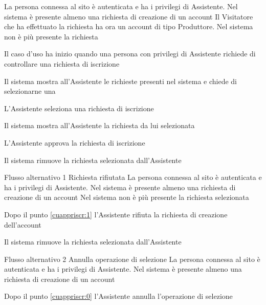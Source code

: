 {}
{La persona connessa al sito è autenticata e ha i privilegi di  Assistente. Nel sistema è presente almeno una richiesta di creazione di un account}
{Il Visitatore che ha effettuato la richiesta ha ora un account di tipo Produttore. Nel sistema non è più presente la richiesta}
{\begin{enumCU}
	\item Il caso d'uso ha inizio quando una persona con privilegi di Assistente richiede di controllare una richiesta di iscrizione
	\item Il sistema mostra all'Assistente le richieste presenti nel sistema e chiede di selezionarne una\label{cuappriscr:0}
	\item L'Assistente seleziona una richiesta di iscrizione
	\item Il sistema mostra all'Assistente la richiesta da lui selezionata\label{cuappriscr:1}
	\item L'Assistente approva la richiesta di iscrizione
	\item Il sistema rimuove la richiesta selezionata dall'Assistente
\end{enumCU}}
%
{Flusso alternativo 1}%
{Richiesta rifiutata}%
{La persona connessa al sito è autenticata e ha i privilegi di  Assistente. Nel sistema è presente almeno una richiesta di creazione di un account}%
{Nel sistema non è più presente la richiesta selezionata}%
{\begin{enumCU}
		\item Dopo il punto \ref{cuappriscr:1} l'Assistente rifiuta la richiesta di creazione dell'account
		\item Il sistema rimuove la richiesta selezionata dall'Assistente
\end{enumCU}}%
%
{Flusso alternativo 2}%
{Annulla operazione di selezione}%
{La persona connessa al sito è autenticata e ha i privilegi di  Assistente. Nel sistema è presente almeno una richiesta di creazione di un account}%
{\postNulle}%
{\begin{enumCU}
		\item Dopo il punto \ref{cuappriscr:0} l'Assistente annulla l'operazione di selezione
\end{enumCU}}%

